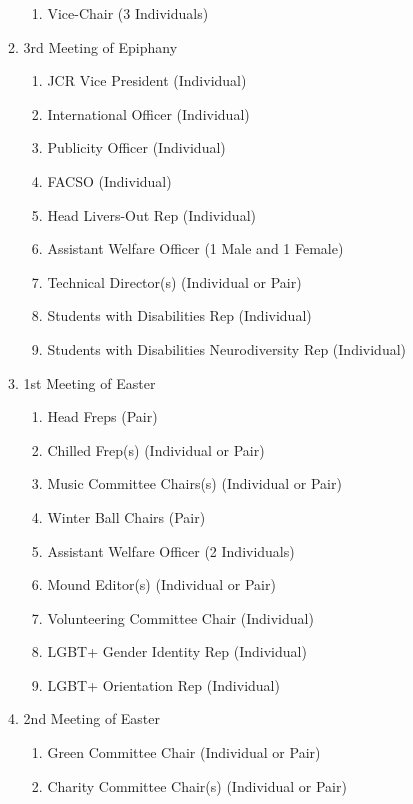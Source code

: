 \begin{enumerate}
\begin{enumerate}
\begin{enumerate}
            \item Vice-Chair (3 Individuals)
        \end{enumerate}
        \item 3rd Meeting of Epiphany
        \begin{enumerate}
            \item JCR Vice President (Individual) 
            \item International Officer (Individual) 
            \item Publicity Officer (Individual) 
            \item FACSO (Individual)
            \item Head Livers-Out Rep (Individual)
            \item Assistant Welfare Officer (1 Male and 1 Female) 
            \item Technical Director(s) (Individual or Pair)
            \item Students with Disabilities Rep (Individual)
            \item Students with Disabilities Neurodiversity Rep (Individual)
        \end{enumerate}
        \item 1st Meeting of Easter
        \begin{enumerate}
            \item Head Freps (Pair)
            \item Chilled Frep(s) (Individual or Pair)
            \item Music Committee Chairs(s) (Individual or Pair) 
            \item Winter Ball Chairs (Pair) 
            \item Assistant Welfare Officer (2 Individuals) 
            \item Mound Editor(s) (Individual or Pair)
            \item Volunteering Committee Chair (Individual)  
            \item LGBT+ Gender Identity Rep (Individual)
            \item LGBT+ Orientation Rep (Individual)
        \end{enumerate}
        \item 2nd Meeting of Easter
        \begin{enumerate}
            \item Green Committee Chair (Individual or Pair) 
            \item Charity Committee Chair(s) (Individual or Pair) 

\end{enumerate}
\end{enumerate}
\end{enumerate}
